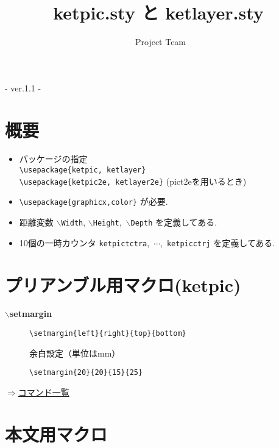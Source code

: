\documentclass[a4j,12pt,dvipdfmx]{ujarticle}
\newcommand{\bs}{$\backslash$}
\newenvironment{cmd}[2]{%
\hypertarget{#2}{}
\begin{center}{\bf\large #1}\end{center}
\begin{description}
}{
\end{description}
\begin{flushright} \hyperlink{functionlist}{$\Rightarrow$コマンド一覧}\end{flushright}
}
\newcommand{\itemketj}[1]{
\item[\Ltab{15mm}{#1}]
}
\begin{document}
\title{{\bf\huge ketpic.sty と ketlayer.sty}}
\author{\ketcindy\ Project Team}
\maketitle

\begin{center}  - ver.1.1 -\end{center}


\section{概要}

\begin{itemize}
\item パッケージの指定\\
\quad\verb|\usepackage{ketpic, ketlayer}|\\
\quad\verb|\usepackage{ketpic2e, ketlayer2e}| (pict2eを用いるとき)
\item \verb|\usepackage{graphicx,color}| が必要.
\item 距離変数 \bs\verb|Width|, \bs\verb|Height|,\ \bs\verb|Depth| を定義してある.
\item 10個の一時カウンタ \verb|ketpictctra|,\ $\cdots$,\ \verb|ketpicctrj| を定義してある.
\end{itemize}

\section{プリアンブル用マクロ(ketpic)}
\vspace{\baselineskip}
\begin{cmd}{\bs setmargin}{setmargin}
\itemketj{使用法}\verb|\setmargin{left}{right}{top}{bottom}|
\itemketj{説明}余白設定（単位はmm）
\itemketj{例}\verb|\setmargin{20}{20}{15}{25}|
\end{cmd}

\section{本文用マクロ}

%
%
%
%
%
%
%
%
\end{document}
